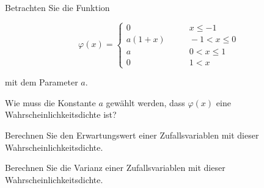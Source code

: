Betrachten Sie die Funktion
\begin{center}
\begin{minipage}{0.45\hsize}
\[
\varphi(x)
=
\begin{cases}
0     &\qquad x \le -1 \\
a(1+x)&\qquad -1<x\le 0\\
a     &\qquad 0<x\le 1\\
0     &\qquad 1< x
\end{cases}
\]
\end{minipage}
\qquad
\begin{minipage}{0.45\hsize}
\end{minipage}
\end{center}
mit dem Parameter $a$.
\begin{teilaufgaben}
\item
Wie muss die Konstante $a$ gewählt werden, dass $\varphi(x)$ eine
Wahrscheinlichkeitsdichte ist?
\item
Berechnen Sie den Erwartungswert einer Zufallsvariablen mit dieser
Wahr\-schein\-lichkeits\-dichte.
\item
Berechnen Sie die Varianz einer Zufallsvariablen mit dieser
Wahrscheinlichkeitsdichte.
\end{teilaufgaben}


